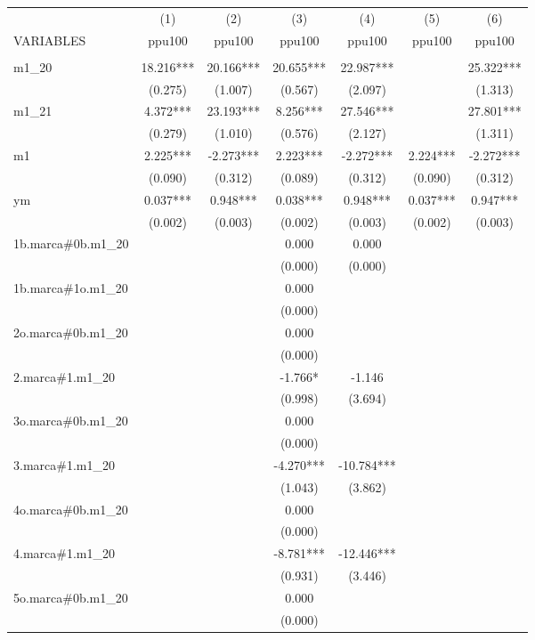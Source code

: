 \begin{tabular}{lcccccc} \hline
 & (1) & (2) & (3) & (4) & (5) & (6) \\
VARIABLES & ppu100 & ppu100 & ppu100 & ppu100 & ppu100 & ppu100 \\ \hline
 &  &  &  &  &  &  \\
m1\_20 & 18.216*** & 20.166*** & 20.655*** & 22.987*** &  & 25.322*** \\
 & (0.275) & (1.007) & (0.567) & (2.097) &  & (1.313) \\
m1\_21 & 4.372*** & 23.193*** & 8.256*** & 27.546*** &  & 27.801*** \\
 & (0.279) & (1.010) & (0.576) & (2.127) &  & (1.311) \\
m1 & 2.225*** & -2.273*** & 2.223*** & -2.272*** & 2.224*** & -2.272*** \\
 & (0.090) & (0.312) & (0.089) & (0.312) & (0.090) & (0.312) \\
ym & 0.037*** & 0.948*** & 0.038*** & 0.948*** & 0.037*** & 0.947*** \\
 & (0.002) & (0.003) & (0.002) & (0.003) & (0.002) & (0.003) \\
1b.marca\#0b.m1\_20 &  &  & 0.000 & 0.000 &  &  \\
 &  &  & (0.000) & (0.000) &  &  \\
1b.marca\#1o.m1\_20 &  &  & 0.000 &  &  &  \\
 &  &  & (0.000) &  &  &  \\
2o.marca\#0b.m1\_20 &  &  & 0.000 &  &  &  \\
 &  &  & (0.000) &  &  &  \\
2.marca\#1.m1\_20 &  &  & -1.766* & -1.146 &  &  \\
 &  &  & (0.998) & (3.694) &  &  \\
3o.marca\#0b.m1\_20 &  &  & 0.000 &  &  &  \\
 &  &  & (0.000) &  &  &  \\
3.marca\#1.m1\_20 &  &  & -4.270*** & -10.784*** &  &  \\
 &  &  & (1.043) & (3.862) &  &  \\
4o.marca\#0b.m1\_20 &  &  & 0.000 &  &  &  \\
 &  &  & (0.000) &  &  &  \\
4.marca\#1.m1\_20 &  &  & -8.781*** & -12.446*** &  &  \\
 &  &  & (0.931) & (3.446) &  &  \\
5o.marca\#0b.m1\_20 &  &  & 0.000 &  &  &  \\
 &  &  & (0.000) &  &  &  \\

\end{tabular}
